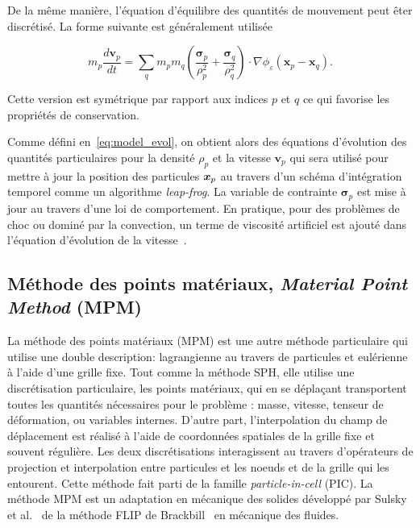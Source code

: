 De la même manière, l'équation d'équilibre des quantités de mouvement peut êter discrétisé. La forme suivante est généralement utilisée

\begin{equation*}
    m_p \frac{d \bm v_p}{dt} = \sum_{q} m_p m_q \left(\frac{\bm \sigma_p}{\rho_p^2} + \frac{\bm \sigma_q}{\rho_q^2} \right) \cdot \nabla \phi_\varepsilon(\bm x_p - \bm x_q).
\end{equation*}

Cette version est symétrique par rapport aux indices $p$ et $q$ ce qui favorise les propriétés de conservation.

Comme défini en~\eqref{eq:model_evol}, on obtient alors des équations d'évolution des quantités particulaires pour la densité $\rho_p$ et la vitesse $\bm v_p$ qui sera utilisé pour mettre à jour la position des particules $\bm{x}_p$ au travers d'un schéma d'intégration temporel comme un algorithme \textit{leap-frog}. La variable de contrainte $\bm \sigma_p$ est mise à jour au travers d'une loi de comportement. En pratique, pour des problèmes de choc ou dominé par la convection, un terme de viscosité artificiel est ajouté dans l'équation d'évolution de la vitesse~\cite{MONAGHAN1983374}.

\subsection{Méthode des points matériaux, \textit{Material Point Method} (MPM)}

La méthode des points matériaux (MPM) est une autre méthode particulaire qui utilise une double description: lagrangienne au travers de particules et eulérienne à l'aide d'une grille fixe. Tout comme la méthode SPH, elle utilise une discrétisation particulaire, les points matériaux, qui en se déplaçant transportent toutes les quantités nécessaires pour le problème : masse, vitesse, tenseur de déformation, ou variables internes. D'autre part, l'interpolation du champ de déplacement est réalisé à l'aide de coordonnées spatiales de la grille fixe et souvent régulière. Les deux discrétisations interagissent au travers d'opérateurs de projection et interpolation entre particules et les noeuds et de la grille qui les entourent. Cette méthode fait parti de la famille \textit{particle-in-cell} (PIC). La méthode MPM est un adaptation en mécanique des solides développé par Sulsky et al.~\cite{sulsky_particle_1994} de la méthode FLIP de Brackbill~\cite{brackbill_flip_1988} en mécanique des fluides.

